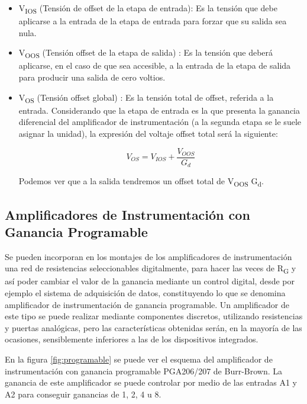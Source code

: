 \begin{itemize}
\item V\textsubscript{IOS} (Tensión de offset de la etapa de entrada): Es la tensión que debe aplicarse a la entrada de la etapa de entrada para forzar que su salida sea nula.
\item V\textsubscript{OOS} (Tensión offset de la etapa de salida) : Es la tensión que deberá aplicarse, en el caso de que sea accesible, a la entrada de la etapa de salida para producir una salida de cero voltios.
\item  V\textsubscript{OS} (Tensión offset global) : Es la tensión total de offset, referida a la entrada. Considerando que la etapa de entrada es la que presenta la ganancia diferencial del amplificador de instrumentación (a la segunda etapa se le suele asignar la unidad), la expresión del voltaje offset total será la siguiente:

\begin{equation}\label{eq7}
V_{OS} = V_{IOS} + \frac{V_{OOS}}{G_d}
\end{equation}

Podemos ver que a la salida tendremos un offset total de V\textsubscript{OOS} G\textsubscript{d}.
\end{itemize}



\subsection{Amplificadores de Instrumentación con Ganancia Programable} %
\label{ganancia_programable}

Se pueden incorporan en los montajes de los amplificadores de instrumentación una red de resistencias seleccionables digitalmente, para hacer las veces de R\textsubscript{G} y así poder cambiar el valor de la ganancia mediante un control digital, desde por ejemplo el sistema de adquisición de datos, constituyendo lo que se denomina amplificador de instrumentación de ganancia programable. Un amplificador de este tipo se puede realizar mediante componentes
discretos, utilizando resistencias y puertas analógicas, pero las características obtenidas serán, en la mayoría de las ocasiones, sensiblemente inferiores a las de los dispositivos integrados.

En la figura \ref{fig:programable}  se puede ver el esquema del amplificador de instrumentación con ganancia programable PGA206/207 de Burr-Brown. La ganancia de este amplificador se puede controlar por medio de las entradas A1 y A2 para conseguir ganancias de 1, 2, 4 u 8.

